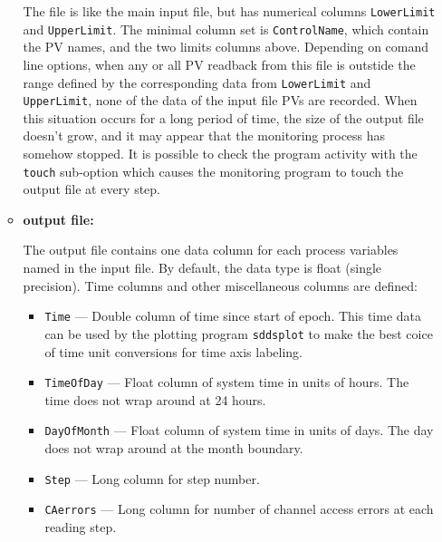 \begin{itemize}
\begin{itemize}
The file is like the main input file, but has numerical columns \verb+LowerLimit+ and \verb+UpperLimit+.
The minimal column set is \verb+ControlName+, which contain the PV names, and the two limits columns above.
Depending on comand line options, when any or all PV readback from this file
is outstide the range defined by the corresponding data from \verb+LowerLimit+ and \verb+UpperLimit+,
none of the data of the input file PVs are recorded. 
When this situation occurs for a long period of time, the size of the output file doesn't
grow, and it may appear that the monitoring process has somehow stopped.
It is possible to check the program activity with the \verb+touch+ sub-option
which causes the monitoring program to touch the output file at every step.

\item {\bf output file:}\par
The output file contains one data column for each process variables named in the input file. By default,
the data type is float (single precision).
Time columns and other miscellaneous columns are defined: 
\begin{itemize}
        \item {\tt Time} --- Double column of time since start of epoch. This time data can be used by
        the plotting program {\verb+sddsplot+} to make the best coice of time unit conversions
        for time axis labeling.
        \item {\tt TimeOfDay} --- Float column of system time in units of hours. 
        The time does not wrap around at 24 hours.
        \item {\tt DayOfMonth} --- Float column of system time in units of days. 
        The day does not wrap around at the month boundary.
        \item {\tt Step} --- Long column for step number.
        \item {\tt CAerrors} --- Long column for number of channel access errors at each reading step. 
\end{itemize}


\end{itemize}
\end{itemize}
